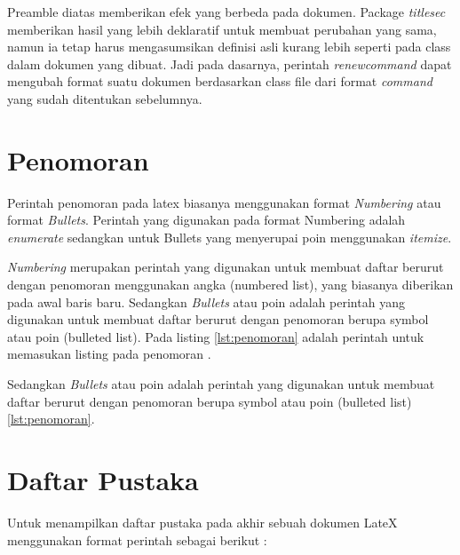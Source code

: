 

Preamble diatas memberikan efek yang berbeda pada dokumen. Package \textit{titlesec} memberikan hasil yang lebih deklaratif untuk membuat perubahan yang sama, namun ia tetap harus mengasumsikan definisi asli kurang lebih seperti pada class dalam dokumen yang dibuat. Jadi pada dasarnya, perintah \textit{renewcommand} dapat mengubah format suatu dokumen berdasarkan class file dari format \textit{command} yang sudah ditentukan sebelumnya.   


\section{Penomoran}
Perintah penomoran pada latex biasanya menggunakan format \textit{Numbering} atau format \textit{Bullets}. Perintah yang digunakan pada format Numbering adalah \textit{enumerate} sedangkan untuk Bullets yang menyerupai poin menggunakan \textit{itemize}.


\textit{Numbering} merupakan perintah yang digunakan untuk membuat daftar berurut dengan penomoran menggunakan angka (numbered list), yang biasanya diberikan pada awal baris baru. Sedangkan \textit{Bullets} atau poin adalah perintah yang digunakan untuk membuat daftar berurut dengan penomoran berupa symbol atau poin (bulleted list). Pada listing \ref{lst:penomoran} adalah perintah untuk memasukan listing pada penomoran .



Sedangkan \textit{Bullets} atau poin adalah perintah yang digunakan untuk membuat daftar berurut dengan penomoran berupa symbol atau poin (bulleted list) \ref{lst:penomoran}.


\section{Daftar Pustaka}
Untuk menampilkan daftar pustaka pada akhir sebuah dokumen LateX menggunakan format perintah sebagai berikut :
